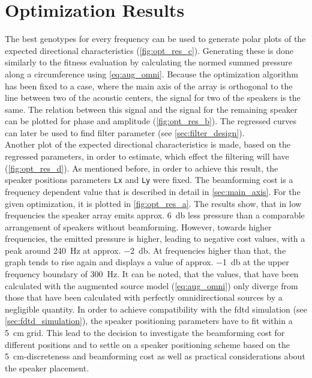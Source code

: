 \section{Optimization Results}\label{sec:opt_result}
The best genotypes for every frequency can be used to generate polar plots of the expected directional characteristics (\autoref{fig:opt_res_c}). Generating these is done similarly to the fitness evaluation by calculating the normed summed pressure along a circumference using \autoref{eq:aug_omni}.
Because the optimization algorithm has been fixed to a case, where the main axis of the array is orthogonal to the line between two of the acoustic centers, the signal for two of the speakers is the same. The relation between this signal and the signal for the remaining speaker can be plotted for phase and amplitude (\autoref{fig:opt_res_b}). The regressed curves can later be used to find filter parameter (see \autoref{sec:filter_design}).\\
Another plot of the expected directional characteristics is made, based on the regressed parameters, in order to estimate, which effect the filtering will have (\autoref{fig:opt_res_d}).
As mentioned before, in order to achieve this result, the speaker positions parameters \textcolor{green3}{\texttt{Lx}} and \textcolor{green3}{\texttt{Ly}} were fixed.  The beamforming cost is a frequency dependent value that is described in detail in \autoref{sec:main_axis}. For the given optimization, it is plotted in \autoref{fig:opt_res_a}. The results show, that in low frequencies the speaker array emits approx. \SI{6}{\decibel} less pressure than a comparable arrangement of speakers without beamforming. However, towards higher frequencies, the emitted pressure is higher, leading to negative cost values, with a peak around \SI{240}{\hertz} at approx. \SI{-2}{\decibel}. At frequencies higher than that, the graph tends to rise again and displays a value of approx. \SI{-1}{\decibel} at the upper frequency boundary of \SI{300}{\hertz}. It can be noted, that the values, that have been calculated with the augmented source model (\autoref{eq:aug_omni}) only diverge from those that have been calculated with perfectly omnidirectional sources by a negligible quantity.
In order to achieve compatibility with the \gls{fdtd} simulation (see \autoref{sec:fdtd_simulation}), the speaker positioning parameters have to fit within a \SI{5}{\centi\meter} grid. This lead to the decision to investigate the beamforming cost for different positions and to settle on a speaker positioning scheme based on the \SI{5}{\centi\meter}-discreteness and beamforming cost as well as practical considerations about the speaker placement.
